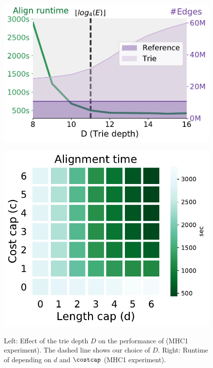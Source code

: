 \begin{figure}[t]
	\centering
	\begin{minipage}{0.45\linewidth}
		\centering
		\includegraphics[width=\linewidth]{figs/trie/MHC1-trie-vs-D.pdf}
		\caption[Performance for various trie depths and heuristic parameters]{Left: Effect of the trie depth $D$ on the performance of \astarix (MHC1 experiment). The dashed line shows our choice of $D$. Right: Runtime of \astarix depending on $d$ and $\costcap$ (MHC1 experiment).}
		\label{TRIEfig:trie_vs_D}
	\end{minipage}%
	\begin{minipage}{0.45\linewidth}
		\centering
		\includegraphics[width=0.8\linewidth]{figs/heuristic/MHC1-heatmap-c_vs_d-align_sec.pdf}
		\label{TRIEfig:heuristic-parameters}
	\end{minipage}
\end{figure}

